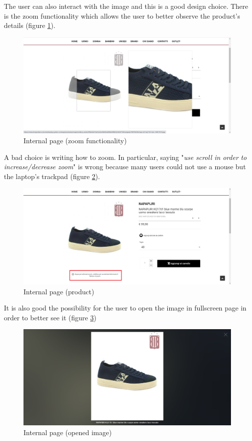 The user can also interact with the image and this
is a good design choice.
There is the zoom functionality which allows the user to better observe the
product's details (figure \ref{internal-zoom}).
\begin{figure}[!h] 
    \centering 
    \includegraphics[scale = 0.29]{images/zoom_product.png} 
    \caption{Internal page (zoom functionality)}
    \label{internal-zoom}
\end{figure}
\newline
A bad choice is writing how to zoom.
In particular, saying "\textit{use scroll in order to increase/decrease zoom}" is wrong because
many users could not use a mouse but the laptop's trackpad (figure \ref{internal-product}).
\begin{figure}[!h] 
    \centering 
    \includegraphics[scale = 0.29]{images/product_price.png} 
    \caption{Internal page (product)}
    \label{internal-product}
\end{figure}
\newpage
It is also good the possibility for the user to open the image in fullscreen page in order to better
see it (figure \ref{internal-opened-image})
\begin{figure}[!h] 
    \centering 
    \includegraphics[scale = 0.29]{images/open_image_product.png} 
    \caption{Internal page (opened image)}
    \label{internal-opened-image}
\end{figure}
